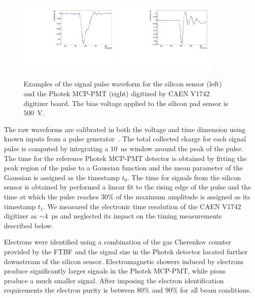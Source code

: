 \documentclass[12pt]{article}
\begin{document}
{\begin{figure}[htbp] 
\centering
\includegraphics[width=0.45\textwidth]{plots/ExampleSiliconPadPulse_6X0_16GeV.pdf} 
\includegraphics[width=0.45\textwidth]{plots/ExamplePhotekPulse.pdf} 
\caption{Examples of the signal pulse waveform for the silicon sensor (left) and
the Photek MCP-PMT (right) digitized by CAEN V1742 digitizer board. The bias
voltage applied to the silicon pad sensor is~$500$~V.} 
\label{fig:pulses} 
\end{figure} 

The raw waveforms are calibrated in both the voltage and time dimension using
known inputs from a pulse generator~\cite{Kim201467}. The total collected charge
for each signal pulse is computed by integrating a $10$~ns window around the
peak of the pulse. The time for the reference Photek MCP-PMT detector is
obtained by fitting the peak region of the pulse to a Gaussian function and the
mean parameter of the Gaussian is assigned as the timestamp $t_0$. The time for
signals from the silicon sensor is obtained by performed a linear fit to the
rising edge of the pulse and the time at which the pulse reaches 30\% of the
maximum amplitude is assigned as its timestamp $t_1$. We measured the
electronic time resolution of the CAEN V1742 digitizer as $\sim$4~ps and
neglected its impact on the timing measurements described below.

Electrons were identified using a combination of the gas Cherenkov counter
provided by the FTBF and the signal size in the Photek detector located further
downstream of the silicon sensor. Electromagnetic showers induced by electrons
produce significantly larger signals in the Photek MCP-PMT, while pions produce
a much smaller signal. After imposing the electron identification 
requirements the electron purity is between $80\%$ and $90\%$ for all beam
conditions. 

}
\end{document}
